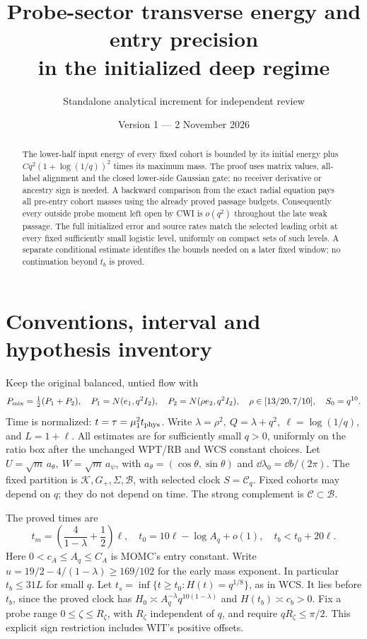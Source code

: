 \documentclass[11pt]{article}
\title{Probe-sector transverse energy and entry precision\\
in the initialized deep regime}
\author{Standalone analytical increment for independent review}
\date{Version 1 --- 2 November 2026}
\numberwithin{equation}{section}
\theoremstyle{remark}\newtheorem{remark}[theorem]{Remark}
\newcommand{\KK}{\mathcal K}\newcommand{\BB}{\mathcal B}
\newcommand{\CC}{\mathcal C}\newcommand{\Gp}{{G_+}}
\begin{document}
\maketitle
\begin{abstract}
The lower-half input energy of every fixed cohort is bounded by
its initial energy plus \(Cq^2(1+\log(1/q))^2\) times its maximum
mass. The proof uses matrix values, all-label alignment and the
closed lower-side Gaussian gate; no receiver derivative or
ancestry sign is needed. A backward comparison from the exact
radial equation pays all pre-entry cohort masses using the
already proved passage budgets. Consequently every outside
probe moment left open by CWI is \(o(q^2)\) throughout the late
weak passage. The full initialized error and source rates match
the selected leading orbit at every fixed sufficiently small
logistic level, uniformly on compact sets of such levels.
A separate conditional estimate identifies the bounds needed
on a later fixed window; no continuation beyond \(t_b\) is proved.
\end{abstract}

\section{Conventions, interval and hypothesis inventory}
\label{an07psev1:inventory}
Keep the original balanced, untied flow with
\[
 P_{\rm mix}=\tfrac12(P_1+P_2),\quad
 P_1=N(e_1,q^2I_2),\quad P_2=N(\rho e_2,q^2I_2),\quad
 \rho\in[13/20,7/10],\quad S_0=q^{10}.
 \]
Time is normalized: \(t=\tau=\mu_1^2t_{\rm phys}\).
Write \(\lambda=\rho^2,\ Q=\lambda+q^2,\ \ell=\log(1/q)\),
and \(L=1+\ell\). All estimates are for sufficiently small
\(q>0\), uniformly on the ratio box after the unchanged
WPT/RB and WCS constant choices.
Let \(U=\sqrt m\,a_\theta,\ W=\sqrt m\,a_\psi\), with
\(a_\theta=(\cos\theta,\sin\theta)\) and
\(\dd\lambda_0=\dd b/(2\pi)\). The fixed partition is
\(\KK,\Gp,\Sigma,\BB\), with selected clock \(S=\mathcal C_q\).
Fixed cohorts may depend on \(q\); they do not depend on time.
The strong complement is \(\CC\subset\BB\).

The proved times are
\[
 t_m=\left(\frac4{1-\lambda}+\frac12\right)\ell,\quad
 t_0=10\ell-\log A_q+o(1),\quad
 t_b<t_0+20\ell .
 \]
Here \(0<c_A\le A_q\le C_A\) is MOMC's entry constant.
Write \(u=19/2-4/(1-\lambda)\ge169/102\) for the early
mass exponent.
In particular \(t_b\le31L\) for small \(q\).
Let \(t_s=\inf\{t\ge t_0:H(t)=q^{1/8}\}\), as in WCS.
It lies before \(t_b\), since the proved clock has
\(H_0\asymp A_q^{-\lambda}q^{10(1-\lambda)}\) and
\(H(t_b)\asymp c_b>0\).
Fix a probe range \(0\le\zeta\le R_\zeta\), with \(R_\zeta\)
independent of \(q\), and require \(qR_\zeta\le\pi/2\).
This explicit sign restriction includes WIT's positive offsets.
\end{document}
